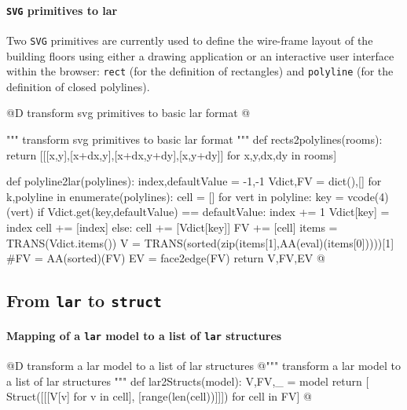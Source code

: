 \documentclass[11pt,oneside]{article}	%
\begin{document}
\paragraph{\texttt{SVG} primitives to lar}
Two \texttt{SVG} primitives are currently used to define the wire-frame layout of the building floors using either a drawing application or an interactive user interface within the browser:  \texttt{rect} (for the definition of rectangles) and \texttt{polyline} (for the definition of closed polylines). 

@D transform svg primitives to basic lar format
@{""" transform svg primitives to basic lar format """
def rects2polylines(rooms): 
	return [[[x,y],[x+dx,y],[x+dx,y+dy],[x,y+dy]] for x,y,dx,dy in rooms]
	
def polyline2lar(polylines):
	index,defaultValue = -1,-1
	Vdict,FV = dict(),[]
	for k,polyline in enumerate(polylines):
		cell = []
		for vert in polyline:
			key = vcode(4)(vert)
			if Vdict.get(key,defaultValue) == defaultValue:
				index += 1
				Vdict[key] = index
				cell += [index]
			else: 
				cell += [Vdict[key]]
		FV += [cell]
	items = TRANS(Vdict.items())
	V = TRANS(sorted(zip(items[1],AA(eval)(items[0]))))[1]
	#FV = AA(sorted)(FV)
	EV = face2edge(FV)
	return V,FV,EV
@}


\subsection{From \texttt{lar} to \texttt{struct}}


\paragraph{Mapping of a \texttt{lar} model to a list of \texttt{lar} structures}

@D transform a lar model to a list of lar structures
@{""" transform a lar model to a list of lar structures """
def lar2Structs(model):
   V,FV,_ = model
   return [ Struct([[[V[v] for v in cell], [range(len(cell))]]]) for cell in FV]
@}
\end{document}
